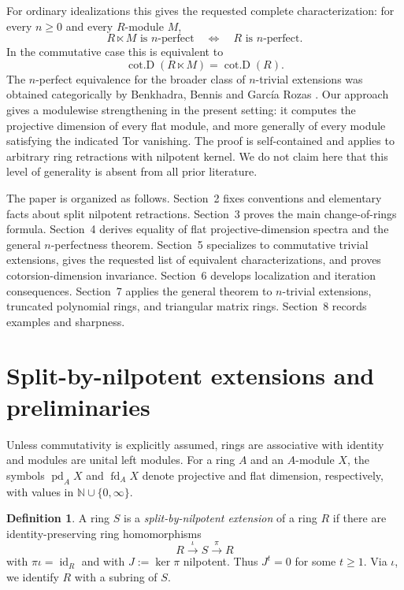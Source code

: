 \documentclass[11pt,reqno]{amsart}
\newcommand{\pd}{\operatorname{pd}}
\newcommand{\fd}{\operatorname{fd}}
\newcommand{\cotD}{\operatorname{cot.D}}
\newcommand{\id}{\operatorname{id}}
\theoremstyle{plain}
\theoremstyle{definition}
\newtheorem{definition}[definition]{Definition}
\theoremstyle{remark}
\begin{document}
For ordinary idealizations this gives the requested complete characterization:
for every $n\ge0$ and every $R$-module $M$,
\[
  R\ltimes M\text{ is }n\text{-perfect}
  \quad\Longleftrightarrow\quad
  R\text{ is }n\text{-perfect}.
\]
In the commutative case this is equivalent to
\[
  \cotD(R\ltimes M)=\cotD(R).
\]
The $n$-perfect equivalence for the broader class of $n$-trivial extensions was
obtained categorically by Benkhadra, Bennis and Garc\'ia Rozas
\cite[Theorem~4.2]{BenkhadraBennisGarcia2020}.  Our approach gives a modulewise strengthening in the present setting: it computes the projective dimension of every flat module, and more generally of every module satisfying the indicated Tor vanishing.  The proof is self-contained and applies to arbitrary ring retractions with nilpotent kernel.  We do not claim here that this level of generality is absent from all prior literature.

The paper is organized as follows.  Section~2 fixes conventions and elementary
facts about split nilpotent retractions.  Section~3 proves the main
change-of-rings formula.  Section~4 derives equality of flat projective-dimension
spectra and the general $n$-perfectness theorem.  Section~5 specializes to
commutative trivial extensions, gives the requested list of equivalent
characterizations, and proves cotorsion-dimension invariance.   Section~6 develops localization and iteration consequences.  Section~7
applies the general theorem to $n$-trivial extensions, truncated polynomial rings,
and triangular matrix rings.  Section~8 records examples and sharpness.

\section{Split-by-nilpotent extensions and preliminaries}

Unless commutativity is explicitly assumed, rings are associative with identity and
modules are unital left modules.  For a ring $A$ and an $A$-module $X$, the symbols
$\pd_AX$ and $\fd_AX$ denote projective and flat dimension, respectively, with
values in $\mathbb N\cup\{0,\infty\}$.

\begin{definition}\label{def:splitnil}
A ring $S$ is a \emph{split-by-nilpotent extension} of a ring $R$ if there are identity-preserving ring homomorphisms
\[
  R\xrightarrow{\ \iota\ }S\xrightarrow{\ \pi\ }R
\]
with $\pi\iota=\id_R$ and with $J:=\ker\pi$ nilpotent.  Thus $J^t=0$ for some
$t\ge1$.  Via $\iota$, we identify $R$ with a subring of $S$.
\end{definition}
\end{document}
